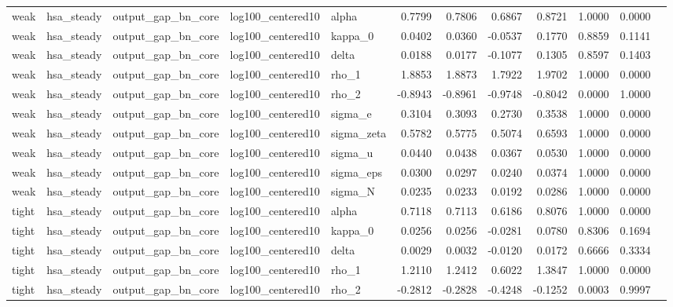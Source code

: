 \begin{tabular}{lllllrrrrrrl}
weak & hsa\_steady & output\_gap\_bn\_core & log100\_centered10 & alpha & 0.7799 & 0.7806 & 0.6867 & 0.8721 & 1.0000 & 0.0000 &  \\
weak & hsa\_steady & output\_gap\_bn\_core & log100\_centered10 & kappa\_0 & 0.0402 & 0.0360 & -0.0537 & 0.1770 & 0.8859 & 0.1141 &  \\
weak & hsa\_steady & output\_gap\_bn\_core & log100\_centered10 & delta & 0.0188 & 0.0177 & -0.1077 & 0.1305 & 0.8597 & 0.1403 &  \\
weak & hsa\_steady & output\_gap\_bn\_core & log100\_centered10 & rho\_1 & 1.8853 & 1.8873 & 1.7922 & 1.9702 & 1.0000 & 0.0000 &  \\
weak & hsa\_steady & output\_gap\_bn\_core & log100\_centered10 & rho\_2 & -0.8943 & -0.8961 & -0.9748 & -0.8042 & 0.0000 & 1.0000 &  \\
weak & hsa\_steady & output\_gap\_bn\_core & log100\_centered10 & sigma\_e & 0.3104 & 0.3093 & 0.2730 & 0.3538 & 1.0000 & 0.0000 &  \\
weak & hsa\_steady & output\_gap\_bn\_core & log100\_centered10 & sigma\_zeta & 0.5782 & 0.5775 & 0.5074 & 0.6593 & 1.0000 & 0.0000 &  \\
weak & hsa\_steady & output\_gap\_bn\_core & log100\_centered10 & sigma\_u & 0.0440 & 0.0438 & 0.0367 & 0.0530 & 1.0000 & 0.0000 &  \\
weak & hsa\_steady & output\_gap\_bn\_core & log100\_centered10 & sigma\_eps & 0.0300 & 0.0297 & 0.0240 & 0.0374 & 1.0000 & 0.0000 &  \\
weak & hsa\_steady & output\_gap\_bn\_core & log100\_centered10 & sigma\_N & 0.0235 & 0.0233 & 0.0192 & 0.0286 & 1.0000 & 0.0000 &  \\
tight & hsa\_steady & output\_gap\_bn\_core & log100\_centered10 & alpha & 0.7118 & 0.7113 & 0.6186 & 0.8076 & 1.0000 & 0.0000 &  \\
tight & hsa\_steady & output\_gap\_bn\_core & log100\_centered10 & kappa\_0 & 0.0256 & 0.0256 & -0.0281 & 0.0780 & 0.8306 & 0.1694 &  \\
tight & hsa\_steady & output\_gap\_bn\_core & log100\_centered10 & delta & 0.0029 & 0.0032 & -0.0120 & 0.0172 & 0.6666 & 0.3334 &  \\
tight & hsa\_steady & output\_gap\_bn\_core & log100\_centered10 & rho\_1 & 1.2110 & 1.2412 & 0.6022 & 1.3847 & 1.0000 & 0.0000 &  \\
tight & hsa\_steady & output\_gap\_bn\_core & log100\_centered10 & rho\_2 & -0.2812 & -0.2828 & -0.4248 & -0.1252 & 0.0003 & 0.9997 &  \\

\end{tabular}
